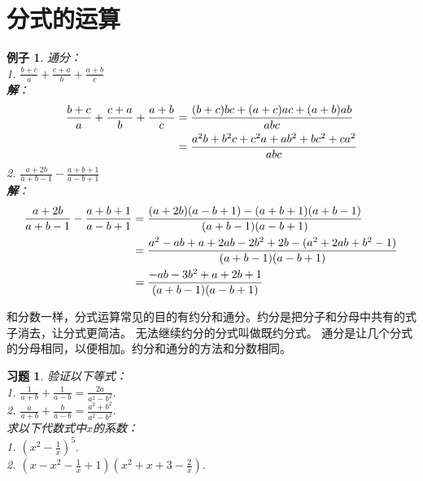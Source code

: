 \documentclass[12pt,UTF8]{ctexbook}
\newtheorem{ex}{例子}[section]
\newtheorem{xt}{习题}[section]
\begin{document}
\section{分式的运算}
\begin{ex}\label{ex:5-1-0}
    通分：\\
    1. $\frac{b+c}{a} + \frac{c+a}{b} + \frac{a+b}{c}$\\
    \textbf{解}：
    \begin{align}
        \frac{b+c}{a} + \frac{c+a}{b} + \frac{a+b}{c} &= \frac{(b+c)bc+(a+c)ac+(a+b)ab}{abc}\notag \\
        &= \frac{ a^2b+b^2c+c^2a + ab^2+bc^2+ca^2}{abc} \notag
    \end{align}
    2. $\frac{a+2b}{a+b-1} - \frac{a+b+1}{a-b+1}$\\
    \textbf{解}：
    \begin{align}
        \frac{a+2b}{a+b-1} - \frac{a+b+1}{a-b+1} &= \frac{(a+2b)(a-b+1) - (a+b+1)(a+b-1)}{(a+b-1)(a-b+1)}\notag \\
        &=  \frac{a^2-ab+a+2ab-2b^2+2b - (a^2+2ab+b^2-1)}{(a+b-1)(a-b+1)} \notag \\
        &= \frac{-ab-3b^2+a+2b+1}{(a+b-1)(a-b+1)} \notag
    \end{align}
\end{ex}

和分数一样，分式运算常见的目的有约分和通分。约分是把分子和分母中共有的式子消去，让分式更简洁。
无法继续约分的分式叫做既约分式。
通分是让几个分式的分母相同，以便相加。约分和通分的方法和分数相同。

\begin{xt}\label{xt:5-1-0}
    验证以下等式：\\
    1. $\frac{1}{a+b} + \frac{1}{a-b} = \frac{2a}{a^2-b^2}.$\\
    2. $\frac{a}{a+b} + \frac{b}{a-b} = \frac{a^2+b^2}{a^2-b^2}.$\\
    求以下代数式中$x$的系数：\\
    1. $(x^2 - \frac{1}{x})^5.$\\
    2. $(x - x^2 - \frac{1}{x} + 1)(x^2 + x + 3 - \frac{2}{x}).$
\end{xt}
\end{document}
